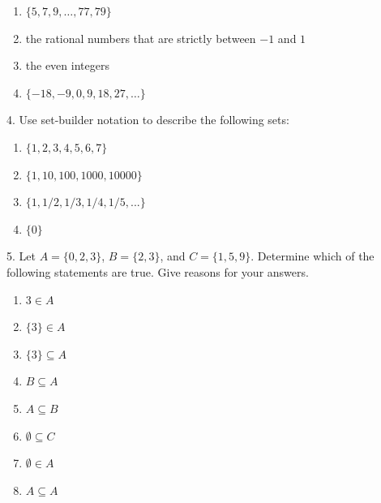 \documentclass[10pt,]{book}
\theoremstyle{plain}
\theoremstyle{definition}
\begin{document}
\begin{exercisegroup}
\leavevmode%
\begin{multicols}{1}
\begin{enumerate}[label=(\alph*)]
\item\hypertarget{li-32}{} \(\{ 5, 7, 9, \dots , 77, 79\}\) \item\hypertarget{li-33}{}the rational numbers that are strictly between \(-1\) and \(1\) \item\hypertarget{li-34}{} the even integers\item\hypertarget{li-35}{} \(\{-18, -9,0,9, 18,27, \dots \}\) \end{enumerate}
\end{multicols}
\par\smallskip
\item[4.]\hypertarget{exercise-4}{}  Use set-builder notation to describe the following sets: 
\leavevmode%
\begin{multicols}{1}
\begin{enumerate}[label=(\alph*)]
\item\hypertarget{li-36}{}\(\{1, 2, 3, 4, 5, 6, 7\}\) \item\hypertarget{li-37}{} \(\{1, 10, 100, 1000, 10000\}\)  \item\hypertarget{li-38}{} \(\{1, 1/2, 1/3, 1/4, 1/5, . . .\}\) \item\hypertarget{li-39}{}  \(\{0\}\)\end{enumerate}
\end{multicols}
\par\smallskip
\item[5.]\hypertarget{exercise-5}{}  Let \(A = \{0, 2, 3\}\), \(B = \{2, 3\}\), and \(C = \{1, 5, 9\}\). Determine which of the following statements are true. Give reasons for
your answers. 
\leavevmode%
\begin{multicols}{2}
\begin{enumerate}[label=(\alph*)]
\item\hypertarget{li-40}{}\(3 \in  A\)\item\hypertarget{li-41}{}\(\{3\} \in  A\) \item\hypertarget{li-42}{}\(\{3\} \subseteq A\)\item\hypertarget{li-43}{} \(B\subseteq A\)\item\hypertarget{li-44}{} \(A\subseteq B\)\item\hypertarget{li-45}{}\(\emptyset \subseteq C\) \item\hypertarget{li-46}{} \(\emptyset \in A\)\item\hypertarget{li-47}{} \(A\subseteq A\)\end{enumerate}
\end{multicols}
\par\smallskip
\end{exercisegroup}
\end{document}
